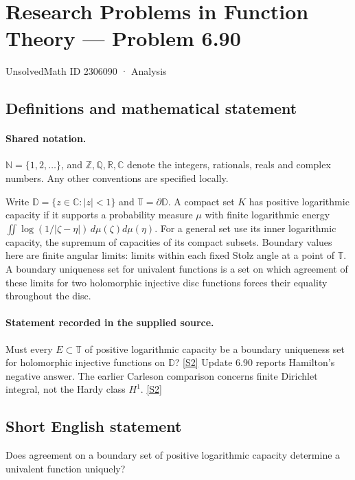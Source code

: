 \documentclass[11pt]{article}
\newcommand{\sref}[2]{\hyperlink{source:#1:#2}{[S#2]}}
\begin{document}
\setcounter{section}{2306089}
\section{Research Problems in Function Theory — Problem 6.90}\label{2306090}
{\small\sffamily UnsolvedMath ID 2306090 · Analysis}
\subsection{Definitions and mathematical statement}

\paragraph{Shared notation.}$\mathbb N=\{1,2,\ldots\}$, and $\mathbb Z,\mathbb Q,\mathbb R,\mathbb C$ denote the integers, rationals, reals and complex numbers. Any other conventions are specified locally.


Write $\mathbb D=\{z\in\mathbb C:|z|<1\}$ and $\mathbb T=\partial\mathbb D$. A compact set $K$ has positive logarithmic capacity if it supports a probability measure $\mu$ with finite logarithmic energy $\iint\log(1/|\zeta-\eta|)\,d\mu(\zeta)d\mu(\eta)$. For a general set use its inner logarithmic capacity, the supremum of capacities of its compact subsets. Boundary values here are finite angular limits: limits within each fixed Stolz angle at a point of $\mathbb T$. A boundary uniqueness set for univalent functions is a set on which agreement of these limits for two holomorphic injective disc functions forces their equality throughout the disc.
\paragraph{Statement recorded in the supplied source.}
Must every $E\subset\mathbb T$ of positive logarithmic capacity be a boundary uniqueness set for holomorphic injective functions on $\mathbb D$? \sref{2306090}{2}
Update 6.90 reports Hamilton's negative answer. The earlier Carleson comparison concerns finite Dirichlet integral, not the Hardy class $H^1$. \sref{2306090}{2}
\subsection{Short English statement}
Does agreement on a boundary set of positive logarithmic capacity determine a univalent function uniquely?
\end{document}
